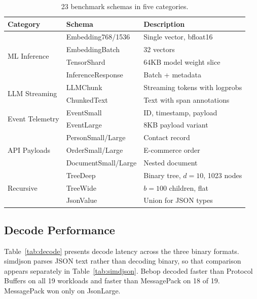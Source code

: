 \documentclass[11pt,onecolumn]{article}
\begin{document}
\begin{table}[ht]
\centering
\small
\begin{tabular}{@{}lll@{}}
\toprule
\textbf{Category} & \textbf{Schema} & \textbf{Description} \\
\midrule
\multirow{4}{*}{ML Inference}
  & Embedding768/1536 & Single vector, bfloat16 \\
  & EmbeddingBatch & 32 vectors \\
  & TensorShard & 64KB model weight slice \\
  & InferenceResponse & Batch + metadata \\
\midrule
\multirow{2}{*}{LLM Streaming}
  & LLMChunk & Streaming tokens with logprobs \\
  & ChunkedText & Text with span annotations \\
\midrule
\multirow{2}{*}{Event Telemetry}
  & EventSmall & ID, timestamp, payload \\
  & EventLarge & 8KB payload variant \\
\midrule
\multirow{3}{*}{API Payloads}
  & PersonSmall/Large & Contact record \\
  & OrderSmall/Large & E-commerce order \\
  & DocumentSmall/Large & Nested document \\
\midrule
\multirow{3}{*}{Recursive}
  & TreeDeep & Binary tree, $d{=}10$, 1023 nodes \\
  & TreeWide & $b{=}100$ children, flat \\
  & JsonValue & Union for JSON types \\
\bottomrule
\end{tabular}
\caption{23 benchmark schemas in five categories.}
\end{table}

\subsection{Decode Performance}

Table~\ref{tab:decode} presents decode latency across the three binary formats. simdjson parses JSON text rather than decoding binary, so that comparison appears separately in Table~\ref{tab:simdjson}. Bebop decoded faster than Protocol Buffers on all 19 workloads and faster than MessagePack on 18 of 19. MessagePack won only on JsonLarge.
\end{document}
